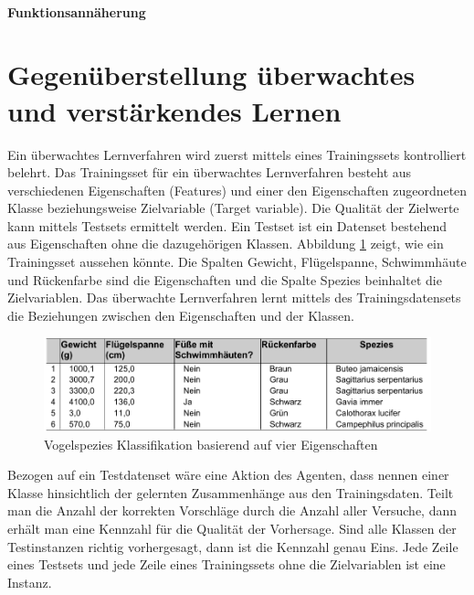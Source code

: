\paragraph{Funktionsannäherung}


\section{Gegenüberstellung überwachtes und verstärkendes Lernen}
Ein überwachtes Lernverfahren wird zuerst mittels eines Trainingssets kontrolliert belehrt. Das Trainingsset für ein überwachtes Lernverfahren besteht aus verschiedenen Eigenschaften (Features) und einer den Eigenschaften zugeordneten Klasse beziehungsweise Zielvariable (Target variable). Die Qualität der Zielwerte kann mittels Testsets ermittelt werden. Ein Testset ist ein Datenset bestehend aus Eigenschaften ohne die dazugehörigen Klassen. Abbildung \ref{fig:vogel_spezies} zeigt, wie ein Trainingsset aussehen könnte\cite[8]{Harrington}. Die Spalten Gewicht, Flügelspanne, Schwimmhäute und Rückenfarbe sind die Eigenschaften und die Spalte Spezies beinhaltet die Zielvariablen. Das überwachte Lernverfahren lernt mittels des Trainingsdatensets die Beziehungen zwischen den Eigenschaften und der Klassen. \\

\begin{figure}[!htbp]
  \centering
  \includegraphics[scale = 0.89]{inhalt/abbildungen/vogel_spezies.pdf}
  \caption{Vogelspezies Klassifikation basierend auf vier Eigenschaften}
  \label{fig:vogel_spezies}
\end{figure} 

Bezogen auf ein Testdatenset wäre eine Aktion des Agenten, dass nennen einer Klasse hinsichtlich der gelernten Zusammenhänge aus den Trainingsdaten. Teilt man die Anzahl der korrekten Vorschläge durch die Anzahl aller Versuche, dann erhält man eine Kennzahl für die Qualität der Vorhersage. Sind alle Klassen der Testinstanzen richtig vorhergesagt, dann ist die Kennzahl genau Eins. Jede Zeile eines Testsets und jede Zeile eines Trainingssets ohne die Zielvariablen ist eine Instanz. \\


